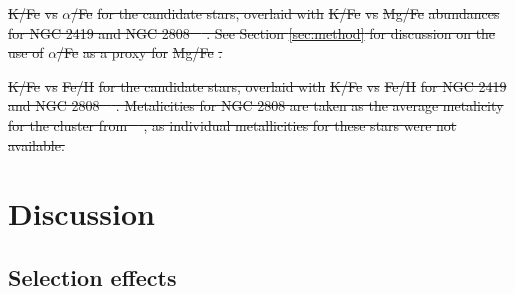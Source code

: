 \documentclass[a4paper,fleqn,usenatbib]{mnras}
\providecommand{\DIFdeltex}[1]{{\protect\color{red}\sout{#1}}}                      %
\providecommand{\DIFdelbegin}{} %
\providecommand{\DIFdelend}{} %
\providecommand{\DIFdelFL}[1]{\DIFdel{#1}} %
\providecommand{\DIFdel}[1]{\texorpdfstring{\DIFdeltex{#1}}{}} %
\newcommand{\DIFscaledelfig}{0.5}
\newlength{\DIFdelgraphicswidth} %
\newlength{\DIFdelgraphicsheight} %
\newcommand{\DIFdelincludegraphics}[2][]{%
\sbox{\DIFdelgraphicsbox}{\DIFOincludegraphics[#1]{#2}}%
\settoboxwidth{\DIFdelgraphicswidth}{\DIFdelgraphicsbox} %
\settoboxtotalheight{\DIFdelgraphicsheight}{\DIFdelgraphicsbox} %
\scalebox{\DIFscaledelfig}{%
\parbox[b]{\DIFdelgraphicswidth}{\usebox{\DIFdelgraphicsbox}\\[-\baselineskip] \rule{\DIFdelgraphicswidth}{0em}}\llap{\resizebox{\DIFdelgraphicswidth}{\DIFdelgraphicsheight}{%
\setlength{\unitlength}{\DIFdelgraphicswidth}%
\begin{picture}(1,1)%
\thicklines\linethickness{2pt} %
{\color[rgb]{1,0,0}\put(0,0){\framebox(1,1){}}}%
{\color[rgb]{1,0,0}\put(0,0){\line( 1,1){1}}}%
{\color[rgb]{1,0,0}\put(0,1){\line(1,-1){1}}}%
\end{picture}%
}\hspace*{3pt}}} %
} %
\DeclareRobustCommand{\DIFdelbegin}{\DIFOdelbegin \let\includegraphics\DIFdelincludegraphics} %
\DeclareRobustCommand{\DIFdelend}{\DIFOaddend \let\includegraphics\DIFOincludegraphics} %
\begin{document}
\DIFdelbegin %
{%
\DIFdelFL{K/Fe}%
\DIFdelFL{vs }%
\DIFdelFL{$\alpha$/Fe}%
\DIFdelFL{for the candidate stars, overlaid with }%
\DIFdelFL{K/Fe}%
\DIFdelFL{vs }%
\DIFdelFL{Mg/Fe}%
\DIFdelFL{abundances for NGC 2419 and NGC 2808 \mbox{%
\citep{cohenkirby2012, mucciarelli2012, mucciarelli2015}}%
. See Section \ref{sec:method} for discussion on the use of }%
\DIFdelFL{$\alpha$/Fe}%
\DIFdelFL{as a proxy for }%
\DIFdelFL{Mg/Fe}%
\DIFdelFL{.}} 

{%
\DIFdelFL{K/Fe}%
\DIFdelFL{vs }%
\DIFdelFL{Fe/H}%
\DIFdelFL{for the candidate stars, overlaid with }%
\DIFdelFL{K/Fe}%
\DIFdelFL{vs }%
\DIFdelFL{Fe/H}%
\DIFdelFL{for NGC 2419 and NGC 2808 \mbox{%
\citep{cohenkirby2012, mucciarelli2012, mucciarelli2015}}%
. Metalicities for NGC 2808 are taken as the average metalicity for the cluster from \mbox{%
\citet{harris1996}}%
, as individual metallicities for these stars were not available.}}

\DIFdelend \section{Discussion}
\label{sec:discussion}

\subsection{Selection effects}
\label{sec:selectioneffects}
\end{document}
